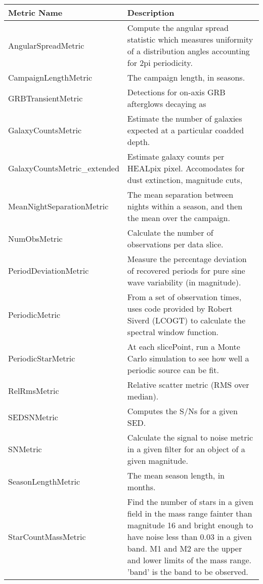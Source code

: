 \begin{table} 
\begin{tabular}{ll}
\hline
                 Metric Name &                                                                                                                                                                                                                                           Description \\
\hline
 AngularSpreadMetric &  Compute the angular spread statistic which measures uniformity of a distribution angles accounting for 2pi periodicity. \\
 CampaignLengthMetric &  The campaign length, in seasons.  \\
 GRBTransientMetric &  Detections for on-axis GRB afterglows decaying as  \\
 GalaxyCountsMetric &  Estimate the number of galaxies expected at a particular coadded depth. \\
 GalaxyCountsMetric\_extended &  Estimate galaxy counts per HEALpix pixel. Accomodates for dust extinction, magnitude cuts, \\
 MeanNightSeparationMetric &  The mean separation between nights within a season, and then the mean over the campaign.  \\
 NumObsMetric &  Calculate the number of observations per data slice. \\
 PeriodDeviationMetric &  Measure the percentage deviation of recovered periods for pure sine wave variability (in magnitude). \\
 PeriodicMetric &  From a set of observation times, uses code provided by Robert Siverd (LCOGT) to calculate the spectral window function. \\
 PeriodicStarMetric &  At each slicePoint, run a Monte Carlo simulation to see how well a periodic source can be fit. \\
 RelRmsMetric &  Relative scatter metric (RMS over median). \\
 SEDSNMetric &  Computes the S/Ns for a given SED. \\
 SNMetric &  Calculate the signal to noise metric in a given filter for an object of a given magnitude. \\
 SeasonLengthMetric &  The mean season length, in months. \\
 StarCountMassMetric &  Find the number of stars in a given field in the mass range fainter than magnitude 16 and bright enough to have noise less than 0.03 in a given band. M1 and M2 are the upper and lower limits of the mass range. 'band' is the band to be observed. \\

\end{tabular}
\end{table}

